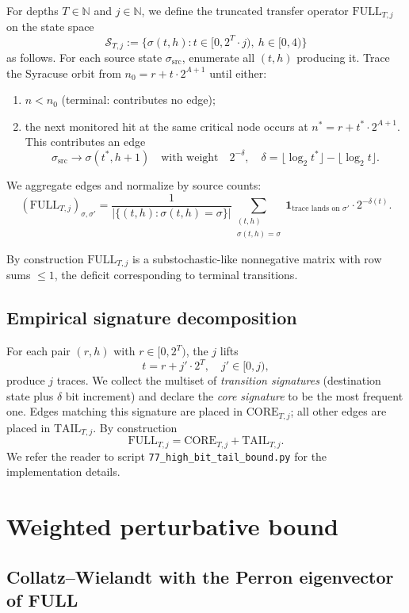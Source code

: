 \documentclass[11pt,a4paper]{article}
\theoremstyle{definition}
\newcommand{\N}{\mathbb{N}}
\newcommand{\full}{\mathrm{FULL}}
\newcommand{\core}{\mathrm{CORE}}
\newcommand{\tail}{\mathrm{TAIL}}
\begin{document}
For depths $T \in \N$ and $j \in \N$, we define the truncated
transfer operator $\full_{T,j}$ on the state space
\[
\mathcal{S}_{T,j} := \{\sigma(t, h) : t \in [0, 2^T \cdot j),\ h \in [0,4)\}
\]
as follows. For each source state $\sigma_{\mathrm{src}}$, enumerate
all $(t, h)$ producing it. Trace the Syracuse orbit from
$n_0 = r + t \cdot 2^{A+1}$ until either:
\begin{enumerate}
  \item $n < n_0$ (terminal: contributes no edge);
  \item the next monitored hit at the same critical node occurs at
        $n^* = r + t^* \cdot 2^{A+1}$. This contributes an edge
        \[
        \sigma_{\mathrm{src}} \to \sigma(t^*, h+1)
        \quad\text{with weight}\quad
        2^{-\delta},
        \quad
        \delta = \lfloor \log_2 t^* \rfloor - \lfloor \log_2 t \rfloor.
        \]
\end{enumerate}
We aggregate edges and normalize by source counts:
\[
(\full_{T,j})_{\sigma, \sigma'}
= \frac{1}{|\{(t,h) : \sigma(t,h)=\sigma\}|}
  \sum_{\substack{(t,h) \\ \sigma(t,h)=\sigma}}
  \mathbf{1}_{\text{trace lands on }\sigma'}
  \cdot 2^{-\delta(t)}.
\]

By construction $\full_{T,j}$ is a substochastic-like nonnegative
matrix with row sums $\le 1$, the deficit corresponding to terminal
transitions.

\subsection{Empirical signature decomposition}

For each pair $(r, h)$ with $r \in [0, 2^T)$, the $j$ lifts
\[
t = r + j' \cdot 2^T, \quad j' \in [0, j),
\]
produce $j$ traces. We collect the multiset of \emph{transition
signatures} (destination state plus $\delta$ bit increment) and
declare the \emph{core signature} to be the most frequent one. Edges
matching this signature are placed in $\core_{T,j}$; all other
edges are placed in $\tail_{T,j}$. By construction
\[
\full_{T,j} = \core_{T,j} + \tail_{T,j}.
\]
We refer the reader to script
\verb|77_high_bit_tail_bound.py| for the implementation details.

\section{Weighted perturbative bound}
\label{sec:bound}

\subsection{Collatz--Wielandt with the Perron eigenvector of FULL}
\end{document}
